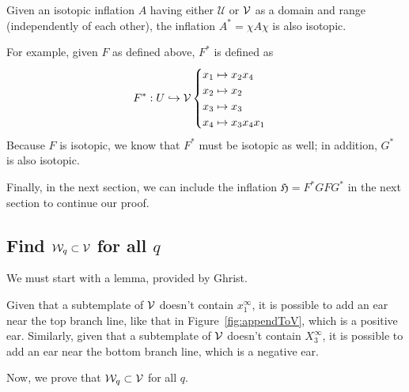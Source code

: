 \documentclass[paper.tex]{subfiles}
\begin{document}
    \begin{lemma}[Ghrist 1997]
        Given an isotopic inflation $A$ having either $\mathcal{U}$ or $\mathcal{V}$ as a domain and range (independently of each other), the inflation $A^* = \chi A \chi$ is also isotopic.
    \end{lemma}

For example, given $F$ as defined above, $F^*$ is defined as $$F^*: U \hookrightarrow \mathcal{V} \begin{cases} x_1 \mapsto x_2 x_4 \\ x_2 \mapsto x_2 \\ x_3 \mapsto x_3 \\ x_4 \mapsto x_3 x_4 x_1 \end{cases}$$ Because $F$ is isotopic, we know that $F^*$ must be isotopic as well; in addition, $G^*$ is also isotopic.

    Finally, in the next section, we can include the inflation $\mathfrak{H} = F^* G F G^*$ in the next section to continue our proof.


\subsection{Find $\mathcal{W}_q \subset \mathcal{V}$ for all $q$}

We must start with a lemma, provided by Ghrist.
\begin{lemma}[Ghrist 1997]
    Given that a subtemplate of $\mathcal{V}$ doesn't contain $x_1^\infty$, it is possible to add an ear near the top branch line, like that in Figure~\ref{fig:appendToV}, which is a positive ear. Similarly, given that a subtemplate of $\mathcal{V}$ doesn't contain $X_3^\infty$, it is possible to add an ear near the bottom branch line, which is a negative ear.
\end{lemma}


Now, we prove that $\mathcal{W}_q \subset \mathcal{V}$ for all $q$.
\end{document}
